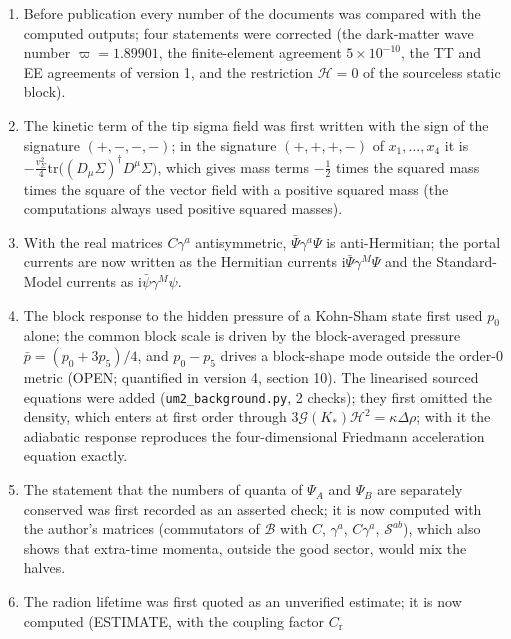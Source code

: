 \documentclass[
  10pt,
]{article}
\begin{document}
\begin{enumerate}
  (IN-17), and the symbol of the portal scale was changed so that it no
  longer clashes with the Dirichlet bound of the tip.
\item
  Before publication every number of the documents was compared with the
  computed outputs; four statements were corrected (the dark-matter wave
  number \(\varpi = 1.89901\), the finite-element agreement
  \(5\times10^{-10}\), the TT and EE agreements of version 1, and the
  restriction \(\mathcal{H} = 0\) of the sourceless static block).
\item
  The kinetic term of the tip sigma field was first written with the
  sign of the signature \((+,-,-,-)\); in the signature \((+,+,+,-)\) of
  \(x_1, \dots, x_4\) it is
  \(-\frac{v_\Sigma^2}{4}\mathrm{tr}\big((D_\mu\Sigma)^\dagger D^\mu\Sigma\big)\),
  which gives mass terms \(-\frac12\) times the squared mass times the
  square of the vector field with a positive squared mass (the
  computations always used positive squared masses).
\item
  With the real matrices \(C\gamma^a\) antisymmetric,
  \(\bar\Psi\gamma^a\Psi\) is anti-Hermitian; the portal currents are
  now written as the Hermitian currents
  \(\mathrm{i}\bar\Psi\gamma^M\Psi\) and the Standard-Model currents as
  \(\mathrm{i}\bar\psi\gamma^M\psi\).
\item
  The block response to the hidden pressure of a Kohn-Sham state first
  used \(p_0\) alone; the common block scale is driven by the
  block-averaged pressure \(\bar p = (p_0 + 3p_5)/4\), and \(p_0 - p_5\)
  drives a block-shape mode outside the order-0 metric (OPEN; quantified
  in version 4, section 10). The linearised sourced equations were added
  (\texttt{um2\_background.py}, 2 checks); they first omitted the
  density, which enters at first order through
  \(3\mathcal{G}(K_*)\mathcal{H}^2 = \kappa\Delta\rho\); with it the
  adiabatic response reproduces the four-dimensional Friedmann
  acceleration equation exactly.
\item
  The statement that the numbers of quanta of \(\Psi_A\) and \(\Psi_B\)
  are separately conserved was first recorded as an asserted check; it
  is now computed with the author's matrices (commutators of
  \(\mathcal{B}\) with \(C\), \(\gamma^a\), \(C\gamma^a\),
  \(\mathcal{S}^{ab}\)), which also shows that extra-time momenta,
  outside the good sector, would mix the halves.
\item
  The radion lifetime was first quoted as an unverified estimate; it is
  now computed (ESTIMATE, with the coupling factor \(C_{\mathrm{r}}\)

\end{enumerate}
\end{document}
